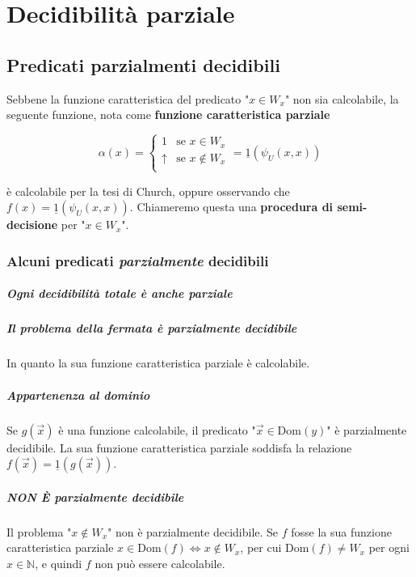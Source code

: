 \chapter{Decidibilità parziale}

\section{Predicati parzialmenti decidibili}

Sebbene la funzione caratteristica del predicato "$x \in W_x$" non sia calcolabile, la seguente funzione, nota come \textbf{funzione caratteristica parziale}

$$
\alpha(x) = \begin{cases}
1 &\text{se } x \in W_x\\
\uparrow &\text{se } x \notin W_x\\
\end{cases}
= \underline{1}(\psi_U(x,x))
$$

è calcolabile per la tesi di Church, oppure osservando che $f(x) = \underline{1}(\psi_U(x,x))$. Chiameremo questa una \textbf{procedura di semi-decisione} per "$x \in W_x$".

\subsection{Alcuni predicati \textit{parzialmente} decidibili}

\paragraph{Ogni decidibilità totale è anche parziale} 

\paragraph{Il problema della fermata è parzialmente decidibile} In quanto la sua funzione caratteristica parziale è calcolabile.

\paragraph{Appartenenza al dominio} Se $g(\vec{x})$ è una funzione calcolabile, il predicato "$\vec{x} \in \mathrm{Dom}(y)$" è parzialmente decidibile. La sua funzione caratteristica parziale soddisfa la relazione $f(\vec{x}) = \underline{1}(g(\vec{x}))$.

\paragraph{NON È parzialmente decidibile} Il problema "$x \notin W_x$" non è parzialmente decidibile. Se $f$ fosse la sua funzione caratteristica parziale $x \in \mathrm{Dom}(f) \Leftrightarrow x \notin W_x$, per cui $\mathrm{Dom}(f) \neq W_x$ per ogni $x \in \mathbb{N}$, e quindi $f$ non può essere calcolabile.

